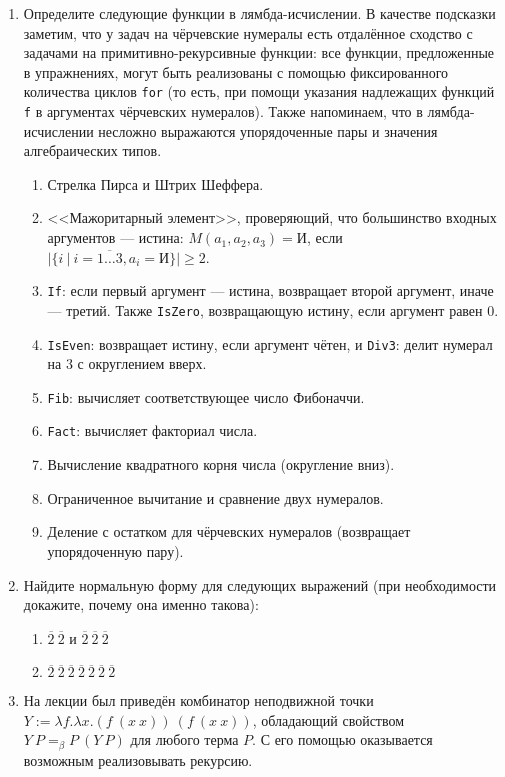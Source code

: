 \documentclass[10pt,a4paper,oneside]{article}
\begin{document}
\begin{enumerate}
\item Определите следующие функции в лямбда-исчислении. В качестве подсказки заметим, что у задач на чёрчевские
нумералы есть отдалённое сходство с задачами на примитивно-рекурсивные функции: все функции, предложенные 
в упражнениях, могут быть реализованы с помощью фиксированного количества циклов \verb!for! (то есть, при помощи 
указания надлежащих функций \verb!f! в аргументах чёрчевских нумералов). Также напоминаем, что в лямбда-исчислении
несложно выражаются упорядоченные пары и значения алгебраических типов.
\begin{enumerate}
\item Стрелка Пирса и Штрих Шеффера.
\item <<Мажоритарный элемент>>, проверяющий, что большинство входных аргументов --- истина: $M(a_1,a_2,a_3) = \text{И}$, 
если $|\{i\ |\ i=\overline{1\dots 3}, a_i = \text{И}\}| \ge 2$.
\item \verb!If!: если первый аргумент --- истина, возвращает второй аргумент, иначе --- третий. Также \verb!IsZero!, 
возвращающую истину, если аргумент равен 0.
\item \verb!IsEven!: возвращает истину, если аргумент чётен, и \verb!Div3!: делит нумерал на 3 с округлением вверх.
\item \verb!Fib!: вычисляет соответствующее число Фибоначчи.
\item \verb!Fact!: вычисляет факториал числа.
\item Вычисление квадратного корня числа (округление вниз).
\item Ограниченное вычитание и сравнение двух нумералов.
\item Деление с остатком для чёрчевских нумералов (возвращает упорядоченную пару).
\end{enumerate}

\item Найдите нормальную форму для следующих выражений (при необходимости докажите, почему она именно такова):
\begin{enumerate}
\item $\overline{2}\ \overline{2}$ и $\overline{2}\ \overline{2}\ \overline{2}$
\item $\overline{2}\ \overline{2}\ \overline{2}\ \overline{2}\ \overline{2}\ \overline{2}\ \overline{2}$
\end{enumerate}

\item На лекции был приведён комбинатор неподвижной точки $Y := \lambda f.\lambda x.(f\ (x\ x))\ (f\ (x\ x))$, обладающий свойством
$Y\ P =_\beta P\ (Y\ P)$ для любого терма $P$. С его помощью оказывается возможным реализовывать рекурсию.


\end{enumerate}
\end{document}
